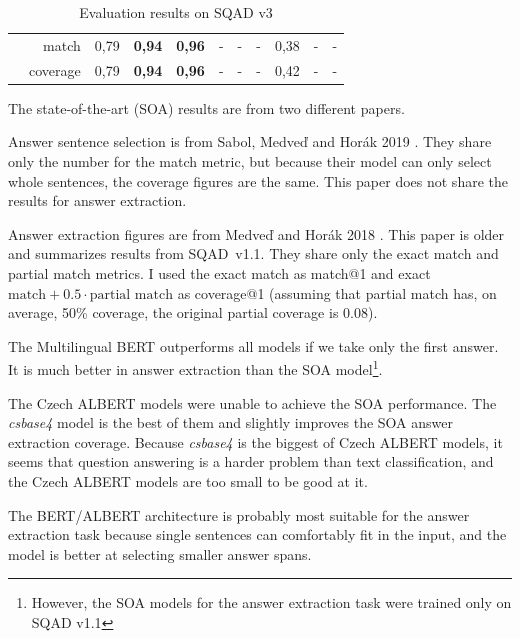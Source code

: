 \documentclass[
  printed, %
  color,   %
  table,   %
  oneside, %
  lof,     %
  lot,     %
]{fithesis3}
\begin{document}
\begin{table}[h]
\begin{adjustbox}{center}
\begin{tabular}{rr|c|c|c|c|c|c|c|c|c}
        \cellcolor{thesis@color@tableOdd} & match &
            0,79 & \textbf{0,94} & \textbf{0,96} & - & - & - & 0,38 & - & - \\
        \cellcolor{thesis@color@tableOdd}\multirow{-2}{*}{SOA} & coverage &
            0,79 & \textbf{0,94} & \textbf{0,96} & - & - & - & 0,42 & - & - \\
        
\end{tabular}
\end{adjustbox}
\caption[Evaluation results on SQAD v3]
{Evaluation results on SQAD v3}
\label{tab:sqad-results}
\end{table} %

\vspace{1em}

{\parindent=0pt
    The state-of-the-art (SOA) results are from two different papers.
}

Answer sentence selection is from Sabol, Medveď and Horák 2019 \parencite[Table 3]{sqad}. They share only the number for the match metric, but because their model can only select whole sentences, the coverage figures are the same. This paper does not share the results for answer extraction.

Answer extraction figures are from Medveď and Horák 2018 \parencite[Table 1 a)]{sqadv1}. This paper is older and summarizes results from SQAD~v1.1. They share only the exact match and partial match metrics. I used the exact match as match@1 and exact $\text{match} + 0.5 \cdot \text{partial match}$  as coverage@1 (assuming that partial match has, on average, 50\% coverage, the original partial coverage is 0.08).  


The Multilingual BERT outperforms all models if we take only the first answer. It is much better in answer extraction than the SOA model\footnote{However, the SOA models for the answer extraction task were trained only on SQAD v1.1}.

The Czech ALBERT models were unable to achieve the SOA performance. The \textit{csbase4} model is the best of them and slightly improves the SOA answer extraction coverage. Because \textit{csbase4} is the biggest of Czech ALBERT models, it seems that question answering is a harder problem than text classification, and the Czech ALBERT models are too small to be good at it. 

The BERT/ALBERT architecture is probably most suitable for the answer extraction task because single sentences can comfortably fit in the input, and the model is better at selecting smaller answer spans. 
\end{document}
